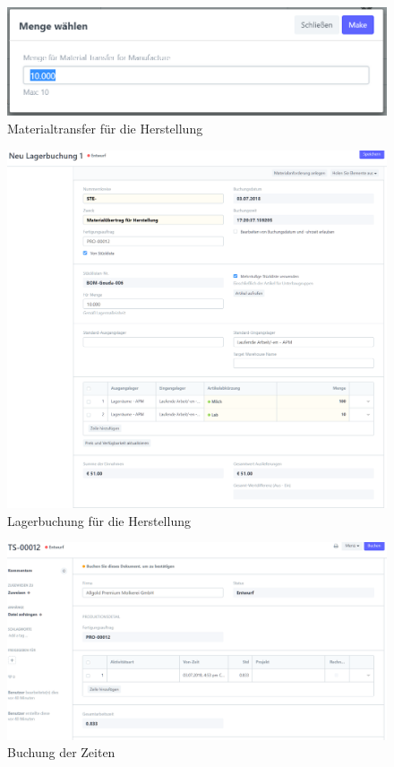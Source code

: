 \begin{figure}
  \centering
  \includegraphics[width=\textwidth]{Bilder/Materialtransfer.PNG}
  \caption{Materialtransfer für die Herstellung}
  \label{fig:matTransfer}
\end{figure}
\begin{figure}
  \centering
  \includegraphics[width=\textwidth]{Bilder/Lagerbuchung.PNG}
  \caption{Lagerbuchung für die Herstellung}
  \label{fig:lagBuchung}
\end{figure}
\begin{figure}
  \centering
  \includegraphics[width=\textwidth]{Bilder/Timesheet.PNG}
  \caption{Buchung der Zeiten}
  \label{fig:timeSheet}
\end{figure}
